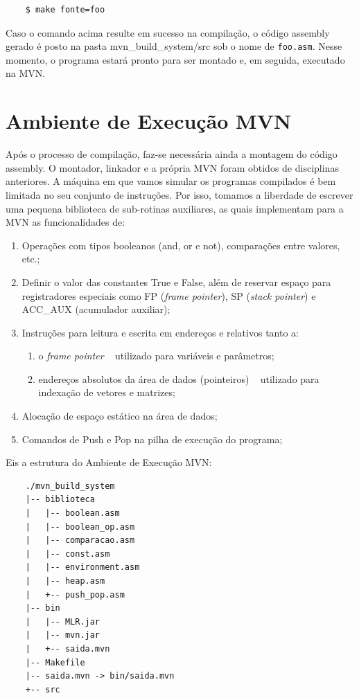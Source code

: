 \documentclass[a4paper,12pt]{report}
\begin{document}
    \begin{verbatim}
    $ make fonte=foo \end{verbatim}

    Caso o comando acima resulte em sucesso na compilação, o código assembly gerado é posto na pasta mvn\_build\_system/src sob o nome de \verb|foo.asm|. Nesse momento, o programa estará pronto para ser montado e, em seguida, executado na MVN.

    \section*{Ambiente de Execução MVN}
    Após o processo de compilação, faz-se necessária ainda a montagem do código assembly. O montador, linkador e a própria MVN foram obtidos de disciplinas anteriores.
    A máquina em que vamos simular os programas compilados é bem limitada no seu conjunto de instruções. Por isso, tomamos a liberdade de escrever uma pequena biblioteca de sub-rotinas auxiliares, as quais implementam para a MVN as funcionalidades de:
    
    \begin{enumerate}
        \item Operações com tipos booleanos (and, or e not), comparações entre valores, etc.;
        \item Definir o valor das constantes True e False, além de reservar espaço para registradores especiais como FP (\textit{frame pointer}), SP (\textit{stack pointer}) e ACC\_AUX (acumulador auxiliar);
        \item Instruções para leitura e escrita em endereços e relativos tanto a:
            \begin{enumerate}
                \item o \textit{frame pointer} \textemdash~ utilizado para variáveis e parâmetros;
                \item endereços absolutos da área de dados (pointeiros) \textemdash~ utilizado para indexação de vetores e matrizes;
            \end{enumerate}
        \item Alocação de espaço estático na área de dados;
        \item Comandos de Push e Pop na pilha de execução do programa;
    \end{enumerate}

    Eis a estrutura do Ambiente de Execução MVN:
    \begin{verbatim}
    ./mvn_build_system
    |-- biblioteca
    |   |-- boolean.asm
    |   |-- boolean_op.asm
    |   |-- comparacao.asm
    |   |-- const.asm
    |   |-- environment.asm
    |   |-- heap.asm
    |   +-- push_pop.asm
    |-- bin
    |   |-- MLR.jar
    |   |-- mvn.jar
    |   +-- saida.mvn
    |-- Makefile
    |-- saida.mvn -> bin/saida.mvn
    +-- src
    \end{verbatim}
\end{document}
